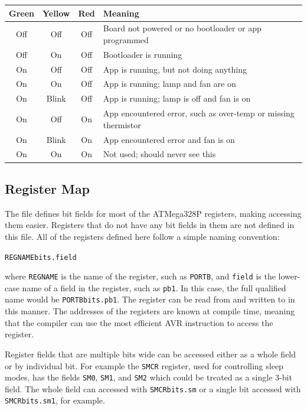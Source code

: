 \documentclass{article}
\begin{document}
\begin{center}
    \begin{tabular}{c|c|c|p{}}
        Green & Yellow & Red & Meaning \\
        \hline
        Off & Off & Off & Board not powered or no bootloader or app programmed \\
        Off & On & Off & Bootloader is running \\
        On & Off & Off & App is running, but not doing anything \\
        On & On & Off & App is running; lamp and fan are on \\
        On & Blink & Off & App is running; lamp is off and fan is on \\
        On & Off & On & App encountered error, such as over-temp or missing thermistor \\
        On & Blink & On & App encountered error and fan is on \\
        On & On & On & Not used; should never see this \\
    \end{tabular}
\end{center}

\subsection{Register Map} \label{ssec:FWRegMap}
The file  defines bit fields for most of the ATMega328P registers,
making accessing them easier.  Registers that do not have any bit fields in them are not defined in
this file.  All of the registers defined here follow a simple naming convention:

\texttt{REGNAMEbits.field}

where \texttt{REGNAME} is the name of the register, such as \texttt{PORTB}, and \texttt{field} is the
lower-case name of a field in the register, such as \texttt{pb1}.  In this case, the full qualified
name would be \texttt{PORTBbits.pb1}.  The register can be read from and written to in this manner.
The addresses of the registers are known at compile time, meaning that the compiler can use the most
efficient AVR instruction to access the register.

Register fields that are multiple bits wide can be accessed either as a whole field or by individual
bit.  For example the \texttt{SMCR} register, used for controlling sleep modes, has the fields
\texttt{SM0}, \texttt{SM1}, and \texttt{SM2} which could be treated as a single 3-bit field.  The
whole field can accessed with \texttt{SMCRbits.sm} or a single bit accessed with
\texttt{SMCRbits.sm1}, for example.
\end{document}

